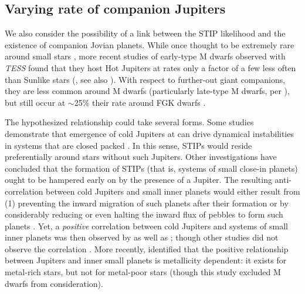 \documentclass[twocolumn]{aastex631}
\begin{document}
\subsection{Varying rate of companion Jupiters}
\label{sec:jupiters}

We also consider the possibility of a link between the STIP likelihood and the existence of companion Jovian planets. While once thought to be extremely rare around small stars \citep{Johnson12}, more recent studies of early-type M dwarfs observed with \textit{TESS} found that they host Hot Jupiters at rates only a factor of a few less often than Sunlike stars (\citealt{gan_occurrence_2022}, see also \citealt{bryant_occurrence_2023}). With respect to further-out giant companions, they are less common around M dwarfs (particularly late-type M dwarfs, per \citealt{pass_mid--late_2023}), but still occur at $\sim$25\% their rate around FGK dwarfs \citep{Clanton16}. 

The hypothesized relationship could take several forms. Some studies demonstrate that  emergence of cold Jupiters at can drive dynamical instabilities in systems that are closed packed \citep{matsumura_effects_2013, Huang17, Lai17,pu_eccentricities_2018, Becker17}. In this sense, STIPs would reside preferentially around stars without such Jupiters. Other investigations have concluded that the formation of STIPs (that is, systems of small close-in planets) ought to be hampered early on by the presence of a Jupiter. The resulting anti-correlation between cold Jupiters and small inner planets would either result from (1) preventing the inward migration of such planets after their formation \citep{izidoro_gas_2015} or by considerably reducing or even halting the inward flux of pebbles to form such planets \citep{lambrechts_formation_2019, mulders_why_2021}. Yet, a \textit{positive} correlation between cold Jupiters and systems of small inner planets was then observed by \cite{Zhu18} as well as \cite{bryan_excess_2019}; though other studies did not observe the correlation \citep{bonomo_cold_2023}. More recently, \cite{bryan_friends_2024} identified that the positive relationship between Jupiters and inner small planets is metallicity dependent: it exists for metal-rich stars, but not for metal-poor stars (though this study excluded M dwarfs from consideration). 
\end{document}
